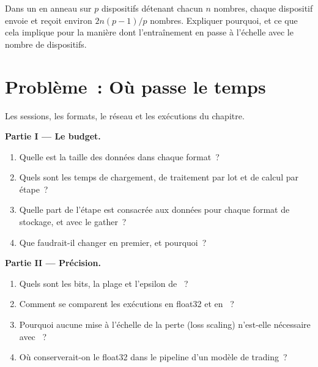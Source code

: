 \begin{exercise}[$\star\star\star$]\label{exo:ml:training-infrastructure:8}
Dans un  en anneau sur $p$ dispositifs détenant chacun $n$ nombres, chaque dispositif envoie et reçoit environ $2n(p-1)/p$ nombres. Expliquer
pourquoi, et ce que cela implique pour la manière dont l'entraînement en  passe à l'échelle avec le nombre de dispositifs.
\end{exercise}

\section{Problème~: Où passe le temps}

\begin{problem}\label{pb:ml:training-infrastructure:1}
Les sessions, les formats, le réseau et les exécutions du chapitre.

\medskip\noindent\textbf{Partie I --- Le budget.}
\begin{enumerate}
\item Quelle est la taille des données dans chaque format~?
\item Quels sont les temps de chargement, de traitement par lot et de calcul par étape~?
\item Quelle part de l'étape est consacrée aux données pour chaque format de stockage, et avec le gather~?
\item Que faudrait-il changer en premier, et pourquoi~?
\end{enumerate}

\medskip\noindent\textbf{Partie II --- Précision.}
\begin{enumerate}[resume]
\item Quels sont les bits, la plage et l'epsilon de ~?
\item Comment se comparent les exécutions en float32 et en ~?
\item Pourquoi aucune mise à l'échelle de la perte (loss scaling) n'est-elle nécessaire avec ~?
\item Où conserverait-on le float32 dans le pipeline d'un modèle de trading~?
\end{enumerate}


\end{problem}
